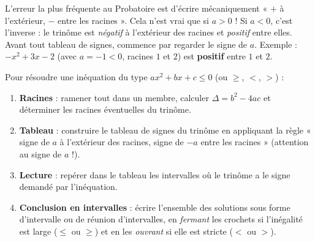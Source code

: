 \documentclass[11pt]{article}
\begin{document}
\begin{attention}
L'erreur la plus fréquente au Probatoire est d'écrire mécaniquement « $+$ à l'extérieur, $-$ entre les racines ». Cela n'est vrai que si $a > 0$ ! Si $a < 0$, c'est l'inverse : le trinôme est \emph{négatif} à l'extérieur des racines et \emph{positif} entre elles. Avant tout tableau de signes, commence par regarder le signe de $a$. Exemple : $-x^2 + 3x - 2$ (avec $a = -1 < 0$, racines $1$ et $2$) est \textbf{positif} entre $1$ et $2$.
\end{attention}

\begin{methode}
Pour résoudre une inéquation du type $ax^2 + bx + c \leq 0$ (ou $\geq$, $<$, $>$) :
\begin{enumerate}
\item \textbf{Racines} : ramener tout dans un membre, calculer $\Delta = b^2 - 4ac$ et déterminer les racines éventuelles du trinôme.
\item \textbf{Tableau} : construire le tableau de signes du trinôme en appliquant la règle « signe de $a$ à l'extérieur des racines, signe de $-a$ entre les racines » (attention au signe de $a$ !).
\item \textbf{Lecture} : repérer dans le tableau les intervalles où le trinôme a le signe demandé par l'inéquation.
\item \textbf{Conclusion en intervalles} : écrire l'ensemble des solutions sous forme d'intervalle ou de réunion d'intervalles, en \emph{fermant} les crochets si l'inégalité est large ($\leq$ ou $\geq$) et en les \emph{ouvrant} si elle est stricte ($<$ ou $>$).
\end{enumerate}
\end{methode}
\end{document}
